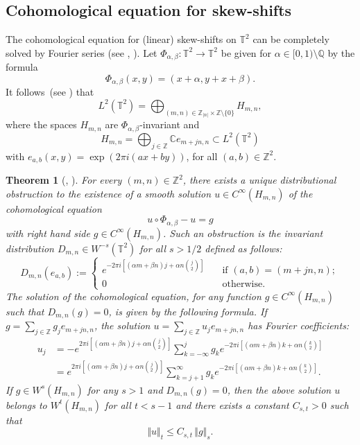 \documentclass[10pt]{amsart}
\newcounter{case}
\theoremstyle{definition}
\theoremstyle{plain}
\newtheorem{theorem}{Theorem}
\newcommand\CC{\mathbb{C}}
\newcommand\QQ{\mathbb{Q}}
\newcommand\TT{\mathbb{T}}
\newcommand\ZZ{\mathbb{Z}}
\begin{document}
\subsection{Cohomological equation for skew-shifts}

The cohomological equation for (linear) skew-shifts on $\TT^2$ can be completely solved by Fourier series (see \cite{Katok:CC}, \cite{AFU}).
Let $\Phi_{\alpha,\beta} :\TT^2\to \TT^2$ be given for $\alpha\in [0,1)\setminus \QQ$ by the formula
\[\Phi_{\alpha,\beta}(x,y)=(x+\alpha,y+x+\beta).\]
It follows~(see \cite{Anz}) that
\begin{equation*}%
L^2(\TT^2)=\bigoplus_{(m,n)\in \ZZ_{|n|}\times\ZZ\setminus\{0\}}H_{m,n},
\end{equation*}
where the spaces $H_{m,n}$ are $\Phi_{\alpha,\beta}$-invariant and
\[
H_{m,n}=\bigoplus_{j\in\ZZ} \CC e_{m+jn,n}\subset L^2(\TT^2)
\]
with $e_{a,b}(x,y)=\exp(2\pi i(ax+by))$, for all $(a,b)\in \ZZ^2$.

\begin{theorem}[{\cite[Th.\,11.25]{Katok:CC}, \cite[Th.\,10]{AFU}}]
\label{thm:smoothcb}
For every $(m,n)\in \ZZ^2$, there exists a unique distributional obstruction to the existence of a smooth solution $u\in C^{\infty} (H_{m,n})$ of the cohomological equation
\[
u\circ \Phi_{\alpha,\beta} - u =g
\]
with right hand side $g \in C^{\infty} (H_{m,n})$. Such an obstruction is the invariant distribution $D_{m,n} \in W^{-s} (\TT^2)$
for all $s>1/2$ defined as follows:
\[
D_{m,n} ( e_{a, b} ) :=
\begin{cases}
e^{-2\pi i [ (\alpha m +\beta n) j + \alpha n\binom{j}{2}] } \quad &\text {if } (a, b) =(m+jn, n); \\
0 \quad &\text{otherwise}.
\end{cases}
\]
The solution of the cohomological equation, for any function $g\in C^{\infty} (H_{m,n})$ such that
$D_{m,n} (g) =0$, is given by the following formula. If $g= \sum_{j\in \ZZ} g_j e_{m+jn, n}$,
the solution $u= \sum_{j\in \ZZ} u_j e_{m+jn, n}$ has Fourier coefficients:
\begin{equation*}
\begin{aligned}
u_j &= - e^{2\pi i [(\alpha m +\beta n)j + \alpha n \binom{j}{2}]} \sum_{k=-\infty}^j g_k
e^{ -2\pi i[(\alpha m +\beta n) k + \alpha n \binom{k}{2}]} \\ &=
e^{2\pi i [(\alpha m +\beta n)j + \alpha n \binom{j}{2}]}
\sum_{k=j+1}^{\infty} g_k e^{ -2\pi i[(\alpha m +\beta n) k + \alpha n \binom{k}{2}]}.
\end{aligned}
\end{equation*}
If $g \in W^s (H_{m,n})$ for any $s>1$ and $D_{m,n} (g) =0$, then the above solution
$u$ belongs to $W^t (H_{m,n})$ for all $t<s-1$ and there exists a constant $C_{s,t} >0$ such that
\[
\Vert u\Vert _t \leq C_{s,t} \, \Vert g \Vert_s.
\]
\end{theorem}
\end{document}
